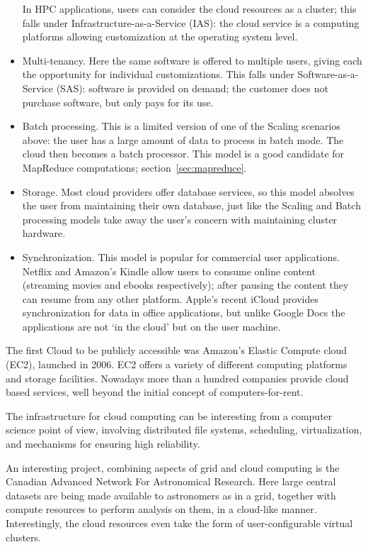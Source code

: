 \begin{itemize}
  In HPC applications, users can consider the cloud resources as a
  cluster; this falls under Infrastructure-as-a-Service (IAS): the
  cloud service is a computing platforms allowing 
  customization at the operating system level.
\item Multi-tenancy. Here the same software is offered to multiple
  users, giving each the opportunity for individual
  customizations. This falls under Software-as-a-Service (SAS):
  software is provided on demand; the customer does not purchase
  software, but only pays for its use.
\item Batch processing. This is a limited version of one of the Scaling
  scenarios above: the user has a large amount of data to process in
  batch mode. The
  cloud then becomes a batch processor. This model is a good candidate
  for MapReduce computations; section~\ref{sec:mapreduce}.
\item Storage. Most cloud providers offer database services, so this
  model absolves the user from maintaining their own database, just
  like the Scaling and Batch processing models take away the user's
  concern with maintaining cluster hardware.
\item Synchronization. This model is popular for commercial user
  applications. Netflix and Amazon's Kindle allow users to consume
  online content (streaming movies and ebooks
  respectively); after pausing the content they can resume from any
  other platform. Apple's recent iCloud provides
  synchronization for data in office applications, but unlike Google
  Docs the applications are not `in the
  cloud' but on the user machine.
\end{itemize}

The first Cloud to be publicly accessible was Amazon's Elastic Compute 
cloud (EC2), launched in 2006. EC2 offers a variety of different 
computing platforms and storage facilities. Nowadays
more than a hundred companies provide cloud based services, well beyond 
the initial concept of computers-for-rent.

The infrastructure for cloud computing can be interesting from a
computer science point of view, involving distributed file systems,
scheduling, virtualization, and mechanisms for ensuring high
reliability.

An interesting project, combining aspects of grid and cloud computing
is the Canadian Advanced Network For Astronomical
Research\cite{canfar-lecture}. Here large central datasets are being
made available to astronomers as in a grid, together with compute
resources to perform analysis on them, in a cloud-like
manner. Interestingly, the cloud resources even take the form of
user-configurable virtual clusters.

